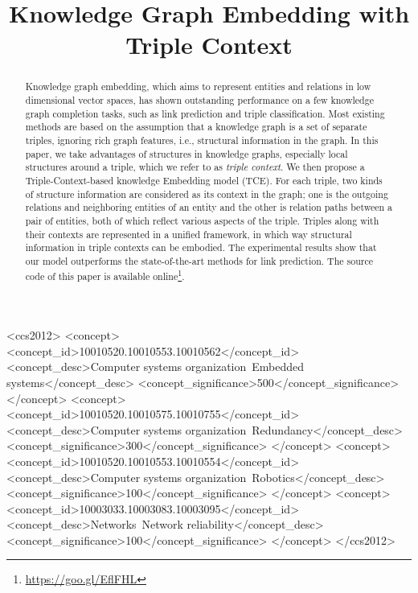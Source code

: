 \documentclass[sigconf]{acmart}
\begin{document}
\title{Knowledge Graph Embedding with Triple Context}

\author{ }
\orcid{ }
\affiliation{%
  \institution{ }
  \streetaddress{ }
  \city{ }
  \state{ }
  \postcode{ }
}
\email{ }


\renewcommand{\shortauthors}{}

\begin{abstract}
Knowledge graph embedding, which aims to represent entities and relations in low dimensional vector spaces, has shown outstanding performance on a few knowledge graph completion tasks, such as link prediction and triple classification. Most existing methods are based on the assumption that a knowledge graph is a set of separate triples, ignoring rich graph features, i.e., structural information in the graph. In this paper, we take advantages of structures in knowledge graphs, especially local structures around a triple, which we refer to as \textit{triple context}. We then propose a Triple-Context-based knowledge Embedding model (TCE). For each triple, two kinds of structure information are considered as its context in the graph; one is the outgoing relations and neighboring entities of an entity and the other is relation paths between a pair of entities, both of which reflect various aspects of the triple. Triples along with their contexts are represented in a unified framework, in which way structural information in triple contexts can be embodied. The experimental results show that our model outperforms the state-of-the-art methods for link prediction. The source code of this paper is available online\footnote{\url{https://goo.gl/EflFHL}}.
\end{abstract}

%
%
\begin{CCSXML}
<ccs2012>
 <concept>
  <concept_id>10010520.10010553.10010562</concept_id>
  <concept_desc>Computer systems organization~Embedded systems</concept_desc>
  <concept_significance>500</concept_significance>
 </concept>
 <concept>
  <concept_id>10010520.10010575.10010755</concept_id>
  <concept_desc>Computer systems organization~Redundancy</concept_desc>
  <concept_significance>300</concept_significance>
 </concept>
 <concept>
  <concept_id>10010520.10010553.10010554</concept_id>
  <concept_desc>Computer systems organization~Robotics</concept_desc>
  <concept_significance>100</concept_significance>
 </concept>
 <concept>
  <concept_id>10003033.10003083.10003095</concept_id>
  <concept_desc>Networks~Network reliability</concept_desc>
  <concept_significance>100</concept_significance>
 </concept>
</ccs2012>
\end{CCSXML}
\end{document}
